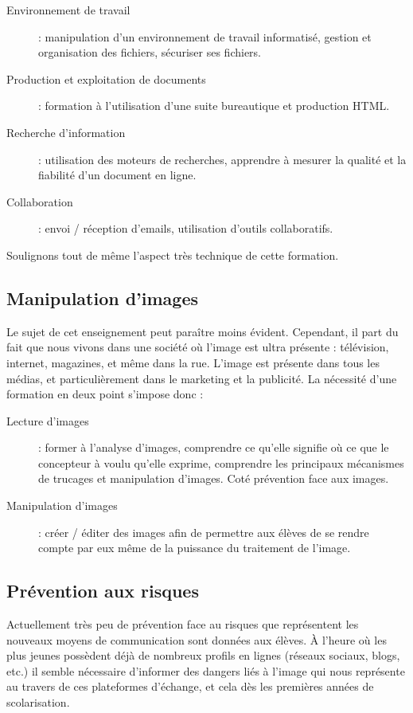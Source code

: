 \begin{description}
  \item[Environnement de travail] : manipulation d'un environnement de travail informatisé, gestion et organisation des fichiers, sécuriser ses fichiers.
  \item[Production et exploitation de documents] : formation à l'utilisation d'une suite bureautique et production HTML.
  \item[Recherche d'information] : utilisation des moteurs de recherches, apprendre à mesurer la qualité et la fiabilité d'un document en ligne.
  \item[Collaboration] : envoi / réception d'emails, utilisation d'outils collaboratifs.
\end{description}

Soulignons tout de même l'aspect très technique de cette formation.

\subsection{Manipulation d'images}
Le sujet de cet enseignement peut paraître moins évident. Cependant, il part du fait que nous vivons dans une société où l'image est ultra présente : télévision, internet, magazines, et même dans la rue. L'image est présente dans tous les médias, et particulièrement dans le marketing et la publicité. La nécessité d'une formation en deux point s'impose donc :

\begin{description}
  \item[Lecture d'images] : former à l'analyse d'images, comprendre ce qu'elle signifie où ce que le concepteur à voulu qu'elle exprime, comprendre les principaux mécanismes de trucages et manipulation d'images. Coté prévention face aux images.
  \item[Manipulation d'images] : créer / éditer des images afin de permettre aux élèves de se rendre compte par eux même de la puissance du traitement de l'image.
\end{description}

\subsection{Prévention aux risques}
Actuellement très peu de prévention face au risques que représentent les nouveaux moyens de communication sont données aux élèves. À l'heure où les plus jeunes possèdent déjà de nombreux profils en lignes (réseaux sociaux, blogs, etc.) il semble nécessaire d'informer des dangers liés à l'image qui nous représente au travers de ces plateformes d'échange, et cela dès les premières années de scolarisation.

